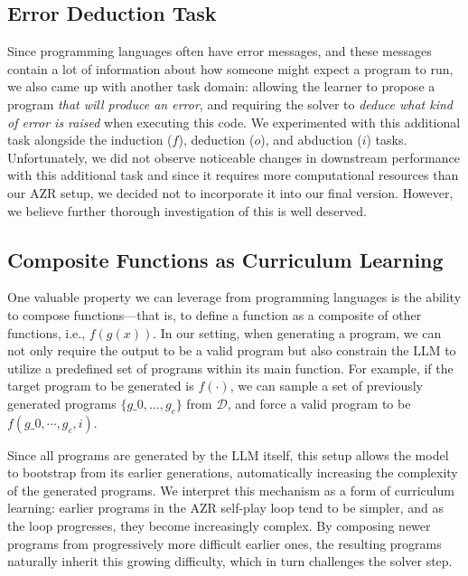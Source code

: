 \documentclass{article}
\begin{document}
\subsection{Error Deduction Task}
Since programming languages often have error messages, and these messages contain a lot of information about how someone might expect a program to run, we also came up with another task domain: allowing the learner to propose a program \emph{that will produce an error}, and requiring the solver to \emph{deduce what kind of error is raised} when executing this code. We experimented with this additional task alongside the induction (\(f\)), deduction (\(o\)), and abduction (\(i\)) tasks. Unfortunately, we did not observe noticeable changes in downstream performance with this additional task and since it requires more computational resources than our AZR setup, we decided not to incorporate it into our final version. However, we believe further thorough investigation of this is well deserved.

\subsection{Composite Functions as Curriculum Learning}
One valuable property we can leverage from programming languages is the ability to compose functions—that is, to define a function as a composite of other functions, i.e., \(f(g(x))\). In our setting, when generating a program, we can not only require the output to be a valid program but also constrain the LLM to utilize a predefined set of programs within its main function. For example, if the target program to be generated is \(f(\cdot)\), we can sample a set of previously generated programs \(\{g\_0, \dots, g_c\}\) from \(\mathcal{D}\), and force a valid program to be \(f(g\_0,\cdots,g_c,i)\).

Since all programs are generated by the LLM itself, this setup allows the model to bootstrap from its earlier generations, automatically increasing the complexity of the generated programs. We interpret this mechanism as a form of curriculum learning: earlier programs in the AZR self-play loop tend to be simpler, and as the loop progresses, they become increasingly complex. By composing newer programs from progressively more difficult earlier ones, the resulting programs naturally inherit this growing difficulty, which in turn challenges the solver step.
\end{document}
